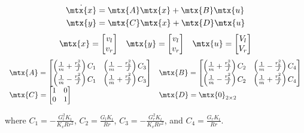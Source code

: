 \begin{theorem}
  \label{thm:diff_drive_velocity_ss_model}

  \begin{align*}
    \dot{\mtx{x}} &= \mtx{A} \mtx{x} + \mtx{B} \mtx{u} \\
    \mtx{y} &= \mtx{C} \mtx{x} + \mtx{D} \mtx{u}
  \end{align*}
  \begin{equation*}
    \begin{array}{ccc}
      \mtx{x} =
      \begin{bmatrix}
        v_l \\
        v_r
      \end{bmatrix} &
      \mtx{y} =
      \begin{bmatrix}
        v_l \\
        v_r
      \end{bmatrix} &
      \mtx{u} =
      \begin{bmatrix}
        V_l \\
        V_r
      \end{bmatrix}
    \end{array}
  \end{equation*}
  \begin{equation}
    \label{eq:diff_drive_ss_model}
    \begin{array}{ll}
      \mtx{A} =
      \begin{bmatrix}
        \left(\frac{1}{m} + \frac{r_b^2}{J}\right) C_1 & \left(\frac{1}{m} - \frac{r_b^2}{J}\right) C_3 \\
        \left(\frac{1}{m} - \frac{r_b^2}{J}\right) C_1 & \left(\frac{1}{m} + \frac{r_b^2}{J}\right) C_3
      \end{bmatrix} &
      \mtx{B} =
      \begin{bmatrix}
        \left(\frac{1}{m} + \frac{r_b^2}{J}\right) C_2 & \left(\frac{1}{m} - \frac{r_b^2}{J}\right) C_4 \\
        \left(\frac{1}{m} - \frac{r_b^2}{J}\right) C_2 & \left(\frac{1}{m} + \frac{r_b^2}{J}\right) C_4
      \end{bmatrix} \\
      \mtx{C} =
      \begin{bmatrix}
        1 & 0 \\
        0 & 1 \\
      \end{bmatrix} &
      \mtx{D} = \mtx{0}_{2 \times 2}
    \end{array}
  \end{equation}

  where $C_1 = -\frac{G_l^2 K_t}{K_v R r^2}$, $C_2 = \frac{G_l K_t}{Rr}$,
  $C_3 = -\frac{G_r^2 K_t}{K_v R r^2}$, and $C_4 = \frac{G_r K_t}{Rr}$.
\end{theorem}

